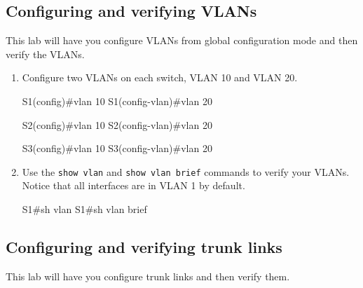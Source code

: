\subsection{Configuring and verifying VLANs}

This lab will have you configure VLANs from global configuration mode
and then verify the VLANs.

\begin{enumerate}
\item
  Configure two VLANs on each switch, VLAN 10 and VLAN 20.

\begin{cli}
S1(config)#vlan 10
S1(config-vlan)#vlan 20
\end{cli}

\begin{cli}
S2(config)#vlan 10
S2(config-vlan)#vlan 20
\end{cli}

\begin{cli}
S3(config)#vlan 10
S3(config-vlan)#vlan 20
\end{cli}
\item
  Use the \texttt{show\ vlan} and \texttt{show\ vlan\ brief} commands to
  verify your VLANs. Notice that all interfaces are in VLAN 1 by
  default.

\begin{cli}
S1#sh vlan
S1#sh vlan brief
\end{cli}
\end{enumerate}

\subsection{Configuring and verifying trunk links}

This lab will have you configure trunk links and then verify them.

